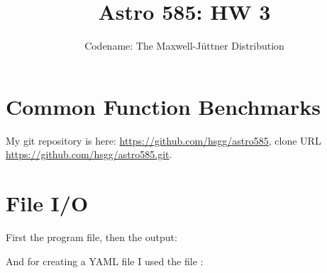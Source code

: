 \documentclass[11pt]{article}
\title{Astro 585: HW 3}
\author{Codename: The Maxwell-Jüttner Distribution}
\begin{document}
\maketitle

\section{Common Function Benchmarks}
My git repository is here: \url{https://github.com/hsgg/astro585}, clone URL
\url{https://github.com/hsgg/astro585.git}.

\section{File I/O}
First the program file, then the output:


And for creating a YAML file I used the file :

\end{document}
